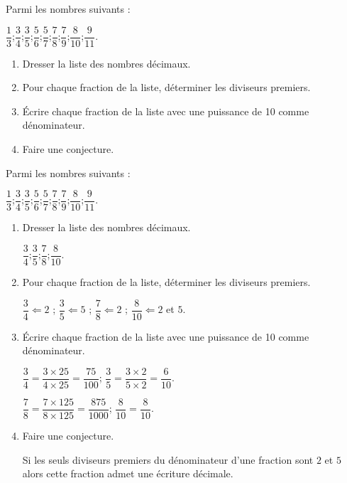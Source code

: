 \begin{exercice*}
    Parmi les nombres suivants :

    $\dfrac{1}{3}$;\hfill$\dfrac{3}{4}$;\hfill$\dfrac{3}{5}$;\hfill$\dfrac{5}{6}$;\hfill$\dfrac{5}{7}$;\hfill$\dfrac{7}{8}$;\hfill$\dfrac{7}{9}$;\hfill$\dfrac{8}{10}$;\hfill$\dfrac{9}{11}$.\hfill
    \begin{enumerate}
        \item Dresser la liste des nombres décimaux.
        \item Pour chaque fraction de la liste, déterminer les diviseurs premiers.
        \item Écrire chaque fraction de la liste avec une puissance de 10 comme dénominateur.
        \item Faire une conjecture.
    \end{enumerate}
\end{exercice*}
\begin{corrige}
    Parmi les nombres suivants :

    $\dfrac{1}{3}$;\hfill$\dfrac{3}{4}$;\hfill$\dfrac{3}{5}$;\hfill$\dfrac{5}{6}$;\hfill$\dfrac{5}{7}$;\hfill$\dfrac{7}{8}$;\hfill$\dfrac{7}{9}$;\hfill$\dfrac{8}{10}$;\hfill$\dfrac{9}{11}$.\hfill

    \begin{enumerate}
        \item Dresser la liste des nombres décimaux.
        
        \smallskip
        {\red $\dfrac{3}{4}$;\hfill$\dfrac{3}{5}$;\hfill$\dfrac{7}{8}$;\hfill$\dfrac{8}{10}$.\hfill}
        \smallskip
        \item Pour chaque fraction de la liste, déterminer les diviseurs premiers.
        
        {\red 
            $\dfrac{3}{4} \Leftarrow 2$ ;\hfill
            $\dfrac{3}{5} \Leftarrow 5$ ;\hfill
            $\dfrac{7}{8} \Leftarrow 2$ ;\hfill
            $\dfrac{8}{10}\Leftarrow 2$ et $5$.
        }
        \item Écrire chaque fraction de la liste avec une puissance de 10 comme dénominateur.
        \begin{spacing}{1.5}            
            {\red
                $\dfrac{3}{4}=\dfrac{3\times 25}{4\times 25}=\dfrac{75}{100}$;\hfill
                $\dfrac{3}{5}=\dfrac{3\times 2}{5\times 2}=\dfrac{6}{10}$.

                $\dfrac{7}{8}=\dfrac{7\times 125}{8\times 125}=\dfrac{875}{1000}$;\hfill
                $\dfrac{8}{10}=\dfrac{8}{10}$.
            }
        \end{spacing}

        \item Faire une conjecture.
        
        {\red Si les seuls diviseurs premiers du dénominateur d'une fraction sont $2$ et $5$ alors cette fraction admet une écriture décimale.}
    \end{enumerate}
\end{corrige}


